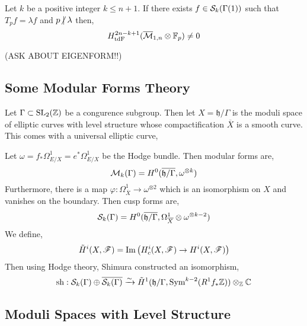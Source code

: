 \documentclass[12pt]{article}
\renewcommand{\C}{\mathbb{C}}
\begin{document}
\begin{thm}
Let $k$ be a positive integer $k \le n + 1$. If there exists $f \in \S_k(\Gamma(1))$ such that $T_p f = \lambda f$ and $p \ndivides \lambda$ then,
\[ H^{2n - k + 1}_{\tdF}(\barM_{1,n} \otimes \ff_p) \neq 0 \]

(ASK ABOUT EIGENFORM!!)
\end{thm}

\subsection{Some Modular Forms Theory}

\newcommand{\h}{\mathfrak{h}}
\renewcommand{\Sym}{\mathrm{Sym}}
\newcommand{\sh}{\mathrm{sh}}

Let $\Gamma \subset \SL{2}{\Z}$ be a congurence subgroup. Then let $X = \h / \Gamma$ is the moduli space of elliptic curves with level structure whose compactification $\overline{X}$ is a smooth curve. This comes with a universal elliptic curve,
\begin{center}
\end{center} 
Let $\omega = f_* \Omega^1_{E/X} = e^* \Omega^1_{E/X}$ be the Hodge bundle. Then modular forms are,
\[ \M_k(\Gamma) = H^0(\overline{\h/\Gamma}, \omega^{\otimes k}) \]
Furthermore, there is a map $\varphi : \Omega^1_{\overline{X}} \to \omega^{\otimes 2}$ which is an isomorphism on $X$ and vanishes on the boundary. Then cusp forms are,
\[ \S_k(\Gamma) = H^0(\overline{\h / \Gamma}, \Omega^1_{\overline{X}} \otimes \omega^{\otimes k-2}) \]
We define,
\[ \tilde{H}^i(X, \F) = \Im{H_c^i(X, \F) \to H^i(X, \F)} \]
Then using Hodge theory, Shimura constructed an isomorphism,
\[ \sh : \S_k(\Gamma) \oplus \overline{\S_k(\Gamma)} \iso \tilde{H}^1(\h/\Gamma, \Sym^{k-2} (R^1 f_* \Z)) \otimes_\Z \C \]

\subsection{Moduli Spaces with Level Structure}

\newcommand{\W}[2]{{}^{#1}_{#2} W_\ell}
\end{document}
